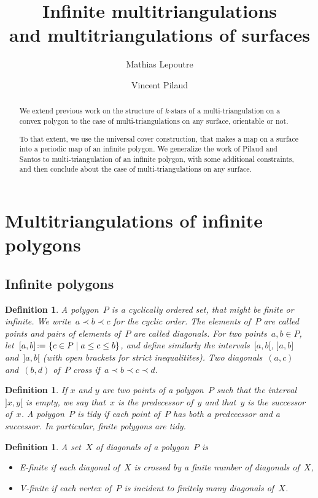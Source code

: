 \documentclass{amsart}
\title[Infinite multitriangulations and multitriangulations of surfaces]{Infinite multitriangulations \\ and multitriangulations of surfaces}
\author{Mathias Lepoutre}
\author{Vincent Pilaud}
\newtheorem{definition}[theorem]{Definition}
\theoremstyle{remark}
\newcommand{\darkblue}{\color{darkblue}} %
\newcommand{\defn}[1]{\textsl{\darkblue #1}} %
\newcommand*{\ef}[0]{E-finite\xspace}
\newcommand*{\vf}[0]{V-finite\xspace}
\newcommand{\cl}{\prec}
\newcommand{\set}[2]{\left\{ #1 \;\middle|\; #2 \right\}} %
\newcommand{\eqdef}{\mbox{\,\raisebox{0.2ex}{\scriptsize\ensuremath{\mathrm:}}\ensuremath{=}\,}} %
\begin{document}
\begin{abstract}
We extend previous work on the structure of $k$-stars of a multi-triangulation on a convex polygon to the case of multi-triangulations on any surface, orientable or not. 

To that extent, we use the universal cover construction, that makes a map on a surface into a periodic map of an infinite polygon. We generalize the work of Pilaud and Santos to multi-triangulation of an infinite polygon, with some additional constraints, and then conclude about the case of multi-triangulations on any surface.
\end{abstract}

\maketitle

\section{Multitriangulations of infinite polygons}

\subsection{Infinite polygons}

\begin{definition}
A \defn{polygon}~$P$ is a cyclically ordered set, that might be finite or infinite.
We write~$a \cl b \cl c$ for the cyclic order.
The elements of~$P$ are called \defn{points} and pairs of elements of~$P$ are called \defn{diagonals}.
For two points~$a,b \in P$, let~$[a,b] \eqdef \set{c \in P}{a \le c \le b}$, and define similarly the intervals~$[a,b[$, $]a,b]$ and~$]a,b[$ (with open brackets for strict inequalitites).
Two diagonals~$(a,c)$ and~$(b,d)$ of~$P$ \defn{cross} if~$a \cl b \cl c \cl d$.
\end{definition}

\begin{definition}
If $x$ and $y$ are two points of a polygon~$P$ such that the interval~$]x,y[$ is empty, we say that~$x$ is the \defn{predecessor} of~$y$ and that~$y$ is the \defn{successor} of~$x$. A polygon~$P$ is \defn{tidy} if each point of~$P$ has both a predecessor and a successor. In particular, finite polygons are tidy.
\end{definition}

\begin{definition}
A set~$X$ of diagonals of a polygon~$P$ is 
\begin{itemize}
\item \defn{\ef} if each diagonal of~$X$ is crossed by a finite number of diagonals of~$X$,
\item \defn{\vf} if each vertex of~$P$ is incident to finitely many diagonals of~$X$.
\end{itemize}
\end{definition}
\end{document}
